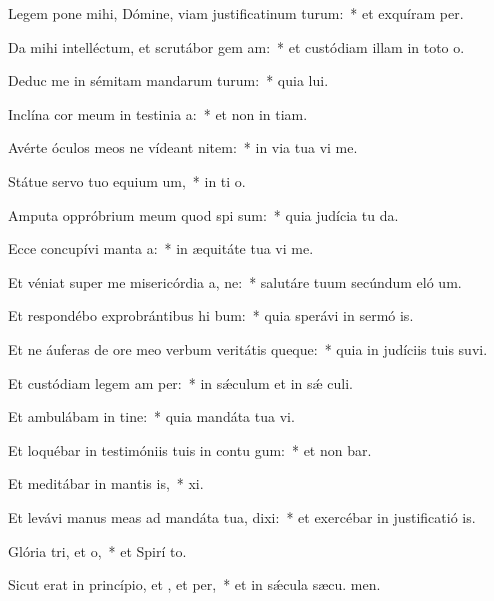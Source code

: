 \item Legem pone mihi, Dómine, viam justificatinum turum:~* et exquíram  per.
\item Da mihi intelléctum, et scrutábor gem am:~* et custódiam illam in toto  o.
\item Deduc me in sémitam mandarum turum:~* quia  lui.
\item Inclína cor meum in testinia a:~* et non in tiam.
\item Avérte óculos meos ne vídeant nitem:~* in via tua vi me.
\item Státue servo tuo equium um,~* in ti o.
\item Amputa oppróbrium meum quod spi sum:~* quia judícia tu da.
\item Ecce concupívi manta a:~* in æquitáte tua vi me.
\item Et véniat super me misericórdia a, ne:~* salutáre tuum secúndum eló um.
\item Et respondébo exprobrántibus hi bum:~* quia sperávi in sermó is.
\item Et ne áuferas de ore meo verbum veritátis queque:~* quia in judíciis tuis suvi.
\item Et custódiam legem am per:~* in sǽculum et in sǽ culi.
\item Et ambulábam in tine:~* quia mandáta tua vi.
\item Et loquébar in testimóniis tuis in contu gum:~* et non bar.
\item Et meditábar in mantis is,~*  xi.
\item Et levávi manus meas ad mandáta tua,  dixi:~* et exercébar in justificatió is.
\item Glória tri, et o,~* et Spirí to.
\item Sicut erat in princípio, et , et per,~* et in sǽcula sæcu. men.
